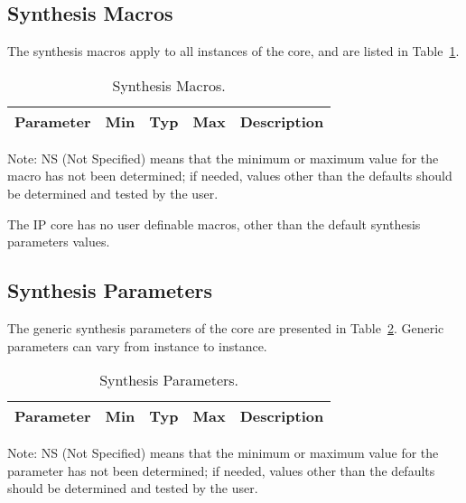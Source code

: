 \subsection{Synthesis Macros}

\ifdefined\SM

The synthesis macros apply to all instances of the core, and are listed in
Table~\ref{tab:sm}.

\begin{table}[h]
  \centering
    \begin{tabularx}{\textwidth}{ | c | c | c | c | X | }
    \hline
    \rowcolor{iob-green}
    {\bf Parameter} & {\bf Min} & {\bf Typ} & {\bf Max} & {\bf Description} \\\hline

    

    \end{tabularx}
  \caption{Synthesis Macros.}
  \label{tab:sm}
\end{table}

\noindent
\small{Note: NS (Not Specified) means that the minimum or maximum value for the
  macro has not been determined; if needed, values other than the defaults
  should be determined and tested by the user.}

\else
The IP core has no user definable macros, other than the default synthesis parameters values.
\fi


\subsection{Synthesis Parameters}

\ifdefined\SP

The generic synthesis parameters of the core are presented in
Table~\ref{tab:sp}. Generic parameters can vary from instance to instance.

\begin{table}[h]
  \centering
    \begin{tabularx}{\textwidth}{ | c | c | c | c | X | }
    \hline
    \rowcolor{iob-green}
    {\bf Parameter} & {\bf Min} & {\bf Typ} & {\bf Max} & {\bf Description} \\\hline

    

    \end{tabularx}
    
\caption{Synthesis Parameters.}
  \label{tab:sp}
\end{table}

\noindent
\small{Note: NS (Not Specified) means that the minimum or maximum value for the
  parameter has not been determined; if needed, values other than the defaults
  should be determined and tested by the user.}

